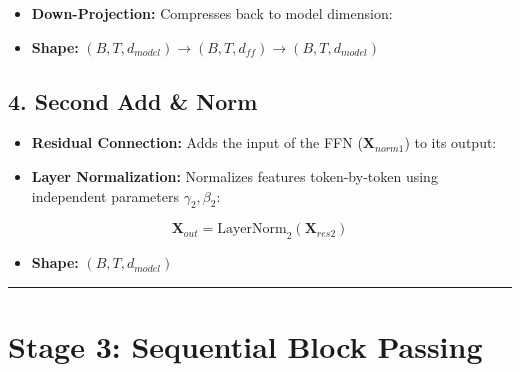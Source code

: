\documentclass[11pt,a4paper,oneside]{report}
\providecommand{\tightlist}{\setlength{\itemsep}{0pt}\setlength{\parskip}{0pt}}
\begin{document}
\begin{itemize}
\tightlist
\item
  \textbf{Down-Projection:} Compresses back to model dimension:
\end{itemize}

\begin{center}\end{center}

\begin{itemize}
\tightlist
\item
  \textbf{Shape:} \((B, T, d_{model}) \rightarrow (B, T, d_{ff}) \rightarrow (B, T, d_{model})\)
\end{itemize}

\subsection{4. Second Add \& Norm}\label{4-second-add--norm}

\begin{itemize}
\tightlist
\item
  \textbf{Residual Connection:} Adds the input of the FFN (\(\mathbf{X}_{norm1}\)) to its output:
\end{itemize}

\begin{center}\end{center}

\begin{itemize}
\tightlist
\item
  \textbf{Layer Normalization:} Normalizes features token-by-token using independent parameters \(\gamma_2, \beta_2\):
\end{itemize}

\[\mathbf{X}_{out} = \text{LayerNorm}_2(\mathbf{X}_{res2})\]

\begin{itemize}
\tightlist
\item
  \textbf{Shape:} \((B, T, d_{model})\)
\end{itemize}

\begin{center}\rule{0.5\linewidth}{0.5pt}\end{center}

\section{Stage 3: Sequential Block Passing}\label{stage-3-sequential-block-passing}
\end{document}
